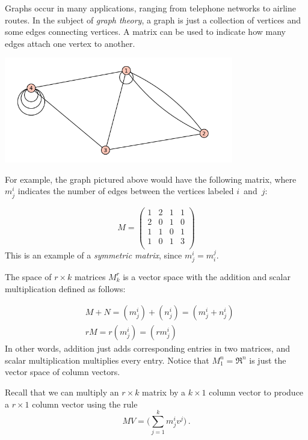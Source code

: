 
\begin{example}
Graphs occur in many applications, ranging from telephone networks to airline routes.  In the subject of \emph{graph theory}, a graph is just a collection of vertices and some edges connecting vertices.  A matrix can be used to indicate how many edges attach one vertex to another.

\begin{center}
\includegraphics[width=10cm]{notes8-0.png}
\end{center}
For example, the graph pictured above would have the following matrix, where $m^i_j$ indicates the number of edges between the vertices labeled $i$~and~$j$:

\[
M = \begin{pmatrix}
1 & 2 & 1 & 1 \\
2 & 0 & 1 & 0 \\
1 & 1 & 0 & 1 \\
1 & 0 & 1 & 3 \\
\end{pmatrix}
\]
This is an example of a \emph{symmetric matrix}, since $m_j^i = m_i^j$.
\end{example}

The space of $r\times k$ matrices $M_k^r$ is a vector space with the addition and scalar multiplication defined as follows:

\begin{align*}
&M+N = (m_j^i) + (n_j^i) = ( m_j^i + n_j^i ) \\
&rM = r(m_j^i) = (rm_j^i)
\end{align*}
In other words, addition just adds corresponding entries in two matrices, and scalar multiplication multiplies every entry.
Notice that $M_1^n = \Re^n$ is just the vector space of column vectors.

Recall that we can multiply an \(r \times k\) matrix by a \(k \times 1\) column vector to produce a \(r \times 1\) column vector using the rule
\[MV = \big(\sum_{j=1}^k m_j^i v^j\big)\, .\]

